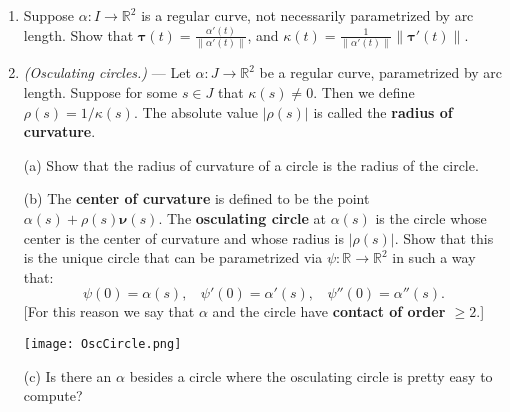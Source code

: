\documentclass[leqno]{book}
\begin{document}
\begin{enumerate}
(b) Show that there is a unique differentiable function $\kappa:J\to\mathbb R$, such that $\boldsymbol\tau'(s)=\kappa(s)\boldsymbol\nu(s)$ for all $s\in J$.  Note that $\kappa$ can be negative, unlike the case for curves in $\mathbb R^3$.  $\kappa(s)$ is called the \textbf{signed curvature} of the plane curve.

(c) Show that there exists a differentiable function $\theta:J\to\mathbb R$, such that $\boldsymbol\tau(s)=(\cos\theta(s),\sin\theta(s))$ for all $s\in J$.  [$\theta$ tells the angle from the positive $x$-axis at which the curve is pointing.]  Then show that $\theta'(s)=\kappa(s)$.  Hence the signed curvature measures how much turning happens relative to the arc length.

(d) If $\alpha:J\to\mathbb R^3$ is a space curve, but its image happens to be contained in the $xy$-plane, how do the vectors $\boldsymbol\tau$, $\boldsymbol\nu$ and the scalar function $\kappa$ in this problem relate to those for space curves covered in this section?

\item Suppose $\alpha:I\to\mathbb R^2$ is a regular curve, not necessarily parametrized by arc length.  Show that $\boldsymbol\tau(t)=\frac{\alpha'(t)}{\|\alpha'(t)\|}$, and $\kappa(t)=\frac 1{\|\alpha'(t)\|}\|\boldsymbol\tau'(t)\|$.

\item\emph{(Osculating circles.)} \---- Let $\alpha:J\to\mathbb R^2$ be a regular curve, parametrized by arc length.  Suppose for some $s\in J$ that $\kappa(s)\ne 0$.  Then we define $\rho(s)=1/\kappa(s)$.  The absolute value $|\rho(s)|$ is called the \textbf{radius of curvature}.

(a) Show that the radius of curvature of a circle is the radius of the circle.

(b) The \textbf{center of curvature} is defined to be the point $\alpha(s)+\rho(s)\boldsymbol\nu(s)$.  The \textbf{osculating circle} at $\alpha(s)$ is the circle whose center is the center of curvature and whose radius is $|\rho(s)|$.  Show that this is the unique circle that can be parametrized via $\psi:\mathbb R\to\mathbb R^2$ in such a way that:
$$\psi(0)=\alpha(s),~~~~\psi'(0)=\alpha'(s),~~~~\psi''(0)=\alpha''(s).$$
[For this reason we say that $\alpha$ and the circle have \textbf{contact of order $\geqslant 2$}.]
\begin{center}
\texttt{[image: OscCircle.png]}
\end{center}

(c) Is there an $\alpha$ besides a circle where the osculating circle is pretty easy to compute?


\end{enumerate}
\end{document}
